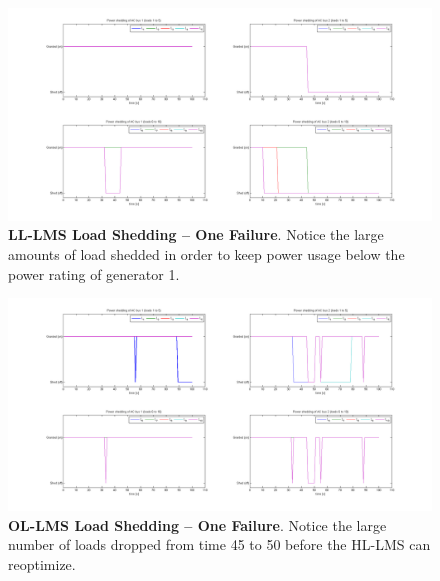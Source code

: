 \documentclass{acm_proc_article-sp}
\begin{document}
\begin{figure}[ht]
  \centering
  \includegraphics[width=0.9\columnwidth]{figures/lsllonefail.png}
  \caption{\textbf{LL-LMS Load Shedding -- One Failure}. Notice
  the large amounts of load shedded in order to keep power usage below the power rating
  of generator 1.}
  \label{fig:lsllonefail}
\end{figure}
\begin{figure}[ht]
  \centering
  \includegraphics[width=0.9\columnwidth]{figures/lsolonefail.png}
  \caption{\textbf{OL-LMS Load Shedding -- One Failure}. Notice the
  large number of loads dropped from time 45 to 50 before the HL-LMS can reoptimize.}
  \label{fig:lsolonefail}
\end{figure}
\end{document}
